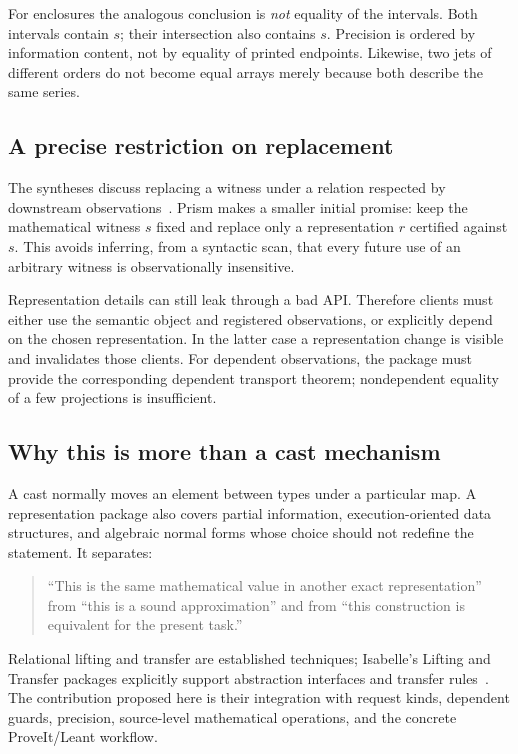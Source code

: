 \documentclass[11pt,a4paper]{article}
\theoremstyle{definition}
\theoremstyle{remark}
\begin{document}
For enclosures the analogous conclusion is \emph{not} equality of the intervals. Both intervals contain $s$; their intersection also contains $s$. Precision is ordered by information content, not by equality of printed endpoints. Likewise, two jets of different orders do not become equal arrays merely because both describe the same series.

\subsection{A precise restriction on replacement}
The syntheses discuss replacing a witness under a relation respected by downstream observations~\cite{synA}. Prism makes a smaller initial promise: keep the mathematical witness $s$ fixed and replace only a representation $r$ certified against $s$. This avoids inferring, from a syntactic scan, that every future use of an arbitrary witness is observationally insensitive.

Representation details can still leak through a bad API. Therefore clients must either use the semantic object and registered observations, or explicitly depend on the chosen representation. In the latter case a representation change is visible and invalidates those clients. For dependent observations, the package must provide the corresponding dependent transport theorem; nondependent equality of a few projections is insufficient.

\subsection{Why this is more than a cast mechanism}
A cast normally moves an element between types under a particular map. A representation package also covers partial information, execution-oriented data structures, and algebraic normal forms whose choice should not redefine the statement. It separates:
\begin{quote}
``This is the same mathematical value in another exact representation'' from ``this is a sound approximation'' and from ``this construction is equivalent for the present task.''
\end{quote}
Relational lifting and transfer are established techniques; Isabelle's Lifting and Transfer packages explicitly support abstraction interfaces and transfer rules~\cite{transfer}. The contribution proposed here is their integration with request kinds, dependent guards, precision, source-level mathematical operations, and the concrete ProveIt/Leant workflow.
\end{document}
